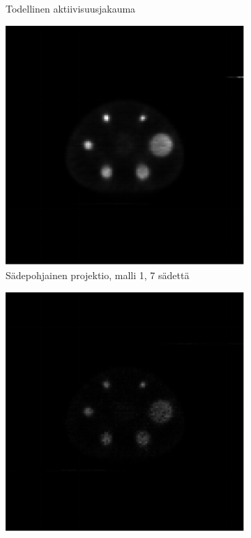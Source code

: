\begin{figure}[H]
\begin{subfigure}[t]{.25\textwidth}
        \caption{Todellinen aktiivisuusjakauma}
    \end{subfigure}%
    \hspace{.075\textwidth}%
    \begin{subfigure}[t]{.25\textwidth}
        \includegraphics[width=\linewidth]{kuvat/rekonstruktio_proj1_malli1_nRay7.pdf}
        \caption{Sädepohjainen projektio, malli 1, 7 sädettä}
    \end{subfigure}
    \begin{subfigure}[b]{.25\textwidth}
        \includegraphics[width=\linewidth]{kuvat/rekonstruktio_proj1_malli2_nRay7.pdf}

\end{subfigure}
\end{figure}
